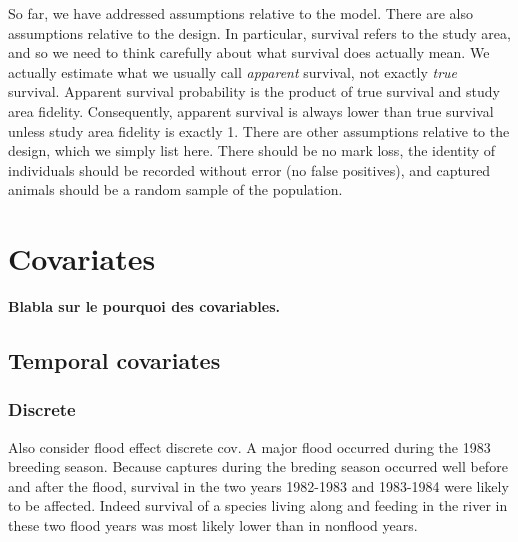 \documentclass[
  12pt,
]{krantz}
\begin{document}
So far, we have addressed assumptions relative to the model. There are also assumptions relative to the design. In particular, survival refers to the study area, and so we need to think carefully about what survival does actually mean. We actually estimate what we usually call \emph{apparent} survival, not exactly \emph{true} survival. Apparent survival probability is the product of true survival and study area fidelity. Consequently, apparent survival is always lower than true survival unless study area fidelity is exactly 1. There are other assumptions relative to the design, which we simply list here. There should be no mark loss, the identity of individuals should be recorded without error (no false positives), and captured animals should be a random sample of the population.

\hypertarget{covariates}{%
\section{Covariates}\label{covariates}}

\textbf{Blabla sur le pourquoi des covariables.}

\hypertarget{temporal-covariates}{%
\subsection{Temporal covariates}\label{temporal-covariates}}

\hypertarget{discrete}{%
\subsubsection{Discrete}\label{discrete}}

Also consider flood effect discrete cov. A major flood occurred during the 1983 breeding season. Because captures during the breding season occurred well before and after the flood, survival in the two years 1982-1983 and 1983-1984 were likely to be affected. Indeed survival of a species living along and feeding in the river in these two flood years was most likely lower than in nonflood years.
\end{document}
